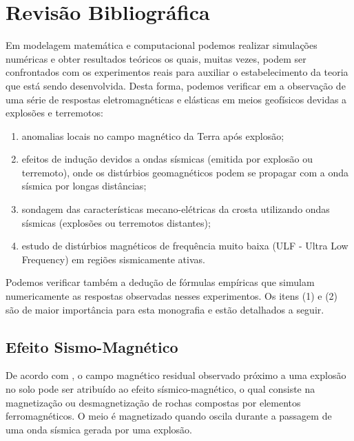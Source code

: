\chapter{Revis\~ao Bibliogr\'afica}

Em modelagem matem\'atica e computacional podemos realizar simula\c{c}\~oes num\'ericas e obter resultados te\'oricos os quais, muitas vezes, podem ser confrontados com os experimentos reais para auxiliar o estabelecimento da teoria que est\'a sendo desenvolvida. Desta forma, podemos verificar em \cite{surkov_97} a observa\c{c}\~ao de uma s\'erie de respostas eletromagn\'eticas e el\'asticas em meios geof\'isicos devidas a explos\~oes e terremotos:
\begin{enumerate}
\item anomalias locais no campo magn\'etico da Terra ap\'os explos\~ao;
\item efeitos de indu\c{c}\~ao devidos a ondas s\'ismicas (emitida por explos\~ao ou terremoto), onde os dist\'urbios geomagn\'eticos podem se propagar com a onda s\'ismica por longas dist\^ancias;
\item sondagem das caracter\'isticas mecano-el\'etricas da crosta utilizando ondas s\'ismicas (explos\~oes ou terremotos distantes);
\item estudo de dist\'urbios magn\'eticos de frequ\^encia muito baixa (ULF - Ultra Low Frequency) em regi\~oes sismicamente ativas.
\end{enumerate}
Podemos verificar tamb\'em a dedu\c{c}\~ao de f\'ormulas emp\'iricas que simulam numericamente as respostas observadas nesses experimentos. Os itens (1) e (2) s\~ao de maior import\^ancia para esta monografia e est\~ao detalhados a seguir.

\section{Efeito Sismo-Magn\'etico}

De acordo com \cite{stacey_64}, o campo magn\'etico residual observado pr\'oximo a uma explos\~ao no solo pode ser atribu\'ido ao efeito s\'ismico-magn\'etico, o qual consiste na magnetiza\c{c}\~ao ou desmagnetiza\c{c}\~ao de rochas compostas por elementos ferromagn\'eticos. O meio \'e magnetizado quando oscila durante a passagem de uma onda s\'ismica gerada por uma explos\~ao.

